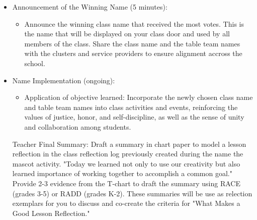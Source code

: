 \documentclass[14pt, letterpaper, twoside]{article}
\begin{document}
\begin{itemize}
\begin{itemize}
\begin{itemize}
    		\end{itemize}
    		\item Announcement of the Winning Name (5 minutes):
		\begin{itemize}
    		\item Announce the winning class name that received the most votes. This is the name that will be displayed on your class door and used	by all members of the class. Share the class name and the table team names with the clusters and service providers to ensure alignment accross the school. 
    		\end{itemize}
		\item Name Implementation (ongoing):
		\begin{itemize}
    		\item Application of objective learned: Incorporate the newly chosen class name and table team names into class activities and events, reinforcing the values of justice, honor, and self-discipline, as well as the sense of unity and collaboration among students. 
    		\end{itemize}
    		
Teacher Final Summary: Draft a summary in chart paper to model a lesson reflection in the class reflection log previously created during the name the mascot activity. 
"Today we learned not only to use our creativity but also learned importance of working together to accomplish a common goal." Provide 2-3 evidence from the T-chart to draft the summary using RACE (grades 3-5) or RADD (grades K-2). These summaries will be use as relection exemplars for you to discuss and co-create the criteria for "What Makes a Good Lesson Reflection."
		\end{itemize}
    
	\end{itemize}
\end{document}
